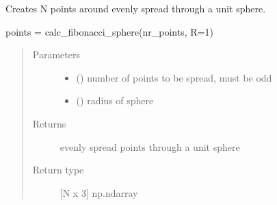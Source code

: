 \documentclass[letterpaper,10pt,english,openany,oneside]{sphinxmanual}
\begin{document}

\begin{fulllineitems}
\label{\detokenize{pygpc:pygpc.testfun.calc_fibonacci_sphere}}
Creates N points around evenly spread through a unit sphere.

points = calc\_fibonacci\_sphere(nr\_points, R=1)
\begin{quote}\begin{description}
\item[{Parameters}] \leavevmode\begin{itemize}
\item {} 
 () \textendash{} number of points to be spread, must be odd

\item {} 
 (\sphinxstyleliteralemphasis{\sphinxupquote{, }}\sphinxstyleliteralemphasis{\sphinxupquote{, }}) \textendash{} radius of sphere

\end{itemize}

\item[{Returns}] \leavevmode
{} \textendash{} evenly spread points through a unit sphere

\item[{Return type}] \leavevmode
{[}N x 3{]} np.ndarray

\end{description}\end{quote}

\end{fulllineitems}

\end{document}
